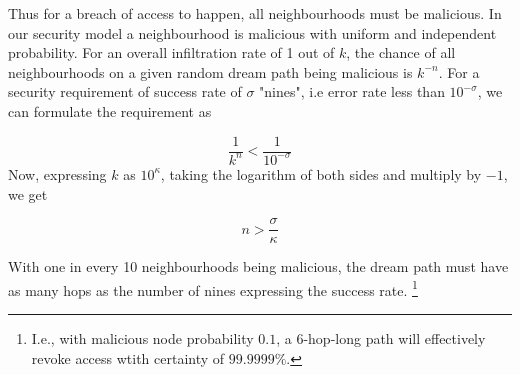 Thus for  a breach of access to happen, all neighbourhoods must be malicious.
In our security model a neighbourhood is malicious with  uniform and independent probability.  For an overall infiltration rate of 1 out of $k$, the chance of all neighbourhoods on a given random dream path being malicious is $k^{-n}$. For a security requirement of success rate of $\sigma$ "nines", i.e error rate less than $10^{-\sigma}$,  we can formulate the requirement as

\begin{equation}
    \frac{1}{k^n}< \frac{1}{10^{-\sigma}}
\end{equation}
Now, expressing $k$ as $10^\kappa$, taking the logarithm of both sides and multiply by $-1$, we get

\begin{equation}
    n > \frac{\sigma}{\kappa}
\end{equation}

With one in every 10 neighbourhoods being malicious, the dream path must have as many hops as the number of nines expressing the success rate.%
%
\footnote{I.e., with malicious node probability $0.1$, a 6-hop-long path will effectively revoke access wtith certainty of $99.9999\%$.}









